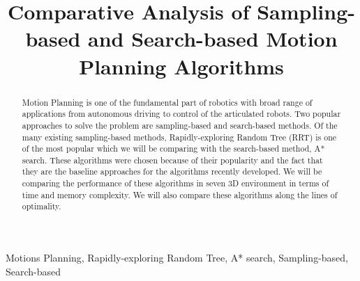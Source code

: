 \documentclass[conference]{IEEEtran}
\begin{document}
\title{Comparative Analysis of Sampling-based and Search-based Motion Planning Algorithms\\
}

\author{
}

\maketitle

\begin{abstract}
Motion Planning is one of the fundamental part of robotics with broad range of applications from autonomous driving to 
control of the articulated robots. Two popular approaches to solve the problem are sampling-based and search-based
methods. Of the many existing sampling-based methods, Rapidly-exploring Random Tree (RRT) is one of the most popular which 
we will be comparing with the search-based method, A* search. These algorithms were chosen because of their popularity and
the fact that they are the baseline approaches for the algorithms recently developed. We will be comparing the performance
of these algorithms in seven 3D environment in terms of time and memory complexity. We will also compare these algorithms 
along the lines of optimality.
\end{abstract}

\begin{IEEEkeywords}
Motions Planning, Rapidly-exploring Random Tree, A* search, Sampling-based, Search-based
\end{IEEEkeywords}
\end{document}
